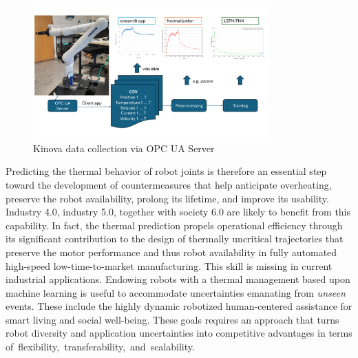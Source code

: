 \documentclass{ifacconf}
\begin{document}
\begin{figure}[t!]
	\begin{center}
		\includegraphics[width=0.81\textwidth]{pictures/DataCollection.pdf} 
		\caption{Kinova data collection via OPC UA Server} 
		\label{fig:DataAquisition}
	\end{center}
\end{figure}

Predicting the thermal behavior of robot joints is therefore an essential step toward the development of countermeasures that help anticipate overheating, preserve the robot availability,  prolong its lifetime, and improve its usability. Industry 4.0, industry 5.0, together with society 6.0 are likely to benefit from this capability. In fact, the thermal prediction propels operational efficiency through its significant contribution to the design of thermally uncritical trajectories that  preserve the motor performance and thus robot availability in fully automated high-speed low-time-to-market manufacturing. This skill is missing in current industrial applications. Endowing robots with a thermal management based upon machine learning is useful to accommodate uncertainties emanating from \textit{unseen} events. These include the highly dynamic robotized human-centered assistance for smart living and social well-being. These goals requires an approach that turns robot diversity and application uncertainties into competitive advantages in terms \mbox{of flexibility,  transferability, and scalability.}
\end{document}
